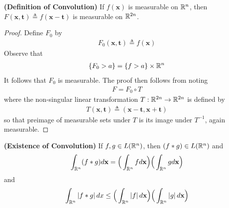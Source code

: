 \documentclass{report}
\begin{document}
\begin{theorem}
\label{DoC}
\textbf{(Definition of Convolution)} If $f(\textbf{x})$ is measurable on $\mathbb{R}^n$, then  $F(\textbf{x},\textbf{t})\triangleq f(\textbf{x}-\textbf{t})$ is measurable on $\mathbb{R}^{2n}$. 
\end{theorem}
\begin{proof}
  Define $F_0$ by 
\begin{align*}
  F_0(\textbf{x},\textbf{t})\triangleq f(\textbf{x})
\end{align*}
Observe that 
\begin{align*}
\{ F_0 >a \}=\{ f>a \}\times \mathbb{R}^n
\end{align*}
It follows that $F_0$ is measurable. The proof then follows from noting 
\begin{align*}
F=F_0 \circ T
\end{align*}
where the non-singular linear transformation $T:\mathbb{R}^{2n}\rightarrow \mathbb{R}^{2n}$ is defined by 
\begin{align*}
T(\textbf{x},\textbf{t})\triangleq (\textbf{x}-\textbf{t},\textbf{x}+\textbf{t})
\end{align*}
so that preimage of measurable sets under $T$ is its image under $T^{-1}$, again measurable. 
\end{proof}
\begin{theorem}
\textbf{(Existence of Convolution)} If $f,g \in L(\mathbb{R}^n)$, then $(f * g)\in L(\mathbb{R}^n)$ and 
\begin{align*}
\int_{\mathbb{R}^n}(f * g)d\textbf{x}= \Big( \int_{\mathbb{R}^n} fd\textbf{x} \Big) \Big(\int_{\mathbb{R}^n}gd\textbf{x} \Big)
\end{align*}
and 
\begin{align*}
\int_{\mathbb{R}^n} \left|f * g\right|dx\leq \Big( \int_{\mathbb{R}^n} \left|f\right|d\textbf{x} \Big) \Big( \int_{\mathbb{R}^n}\left|g\right|d\textbf{x} \Big)
\end{align*}
\end{theorem}
\end{document}
